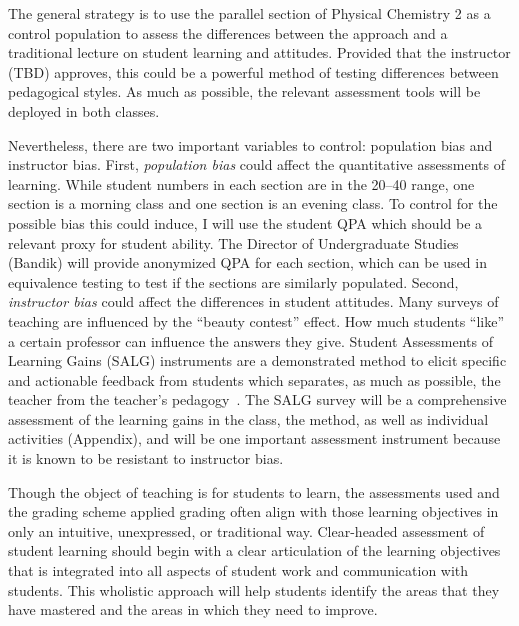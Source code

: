 \documentclass[10pt,letterpaper]{article}
\begin{document}
{The general strategy is to use the parallel section of Physical Chemistry 2 as a control population to assess the differences between the \pogil approach and a traditional lecture on student learning and attitudes. Provided that the instructor (TBD) approves, this could be a powerful method of testing differences between pedagogical styles. As much as possible, the relevant assessment tools will be deployed in both classes. 

Nevertheless, there are two important variables to control: population bias and instructor bias. First, \textit{population bias} could affect the quantitative assessments of learning. While student numbers in each section are in the 20--40 range, one section is a morning class and one section is an evening class. To control for the possible bias this could induce, I will use the student QPA which should be a relevant proxy for student ability. The Director of Undergraduate Studies (Bandik) will provide anonymized QPA for each section, which can be used in equivalence testing to test if the sections are similarly populated. Second, \textit{instructor bias} could affect the differences in student attitudes. Many surveys of teaching are influenced by the ``beauty contest'' effect. How much students ``like'' a certain professor can influence the answers they give. Student Assessments of Learning Gains (SALG) instruments are a demonstrated method to elicit specific and actionable feedback from students which separates, as much as possible, the teacher from the teacher's pedagogy~\cite{Seymour2000}. The SALG survey will be a comprehensive assessment of the learning gains in the class, the \pogil method, as well as individual activities (Appendix), and will be one important assessment instrument because it is known to be resistant to instructor bias.
}%


%
%
Though the object of teaching is for students to learn,  the assessments used and the grading scheme applied grading often align with those learning objectives in only an intuitive, unexpressed, or traditional way. Clear-headed assessment of student learning should begin with a clear articulation of the learning objectives that is integrated into all aspects of student work and communication with students. This wholistic approach will help students identify the areas that they have mastered and the areas in which  they need to improve.
\end{document}
